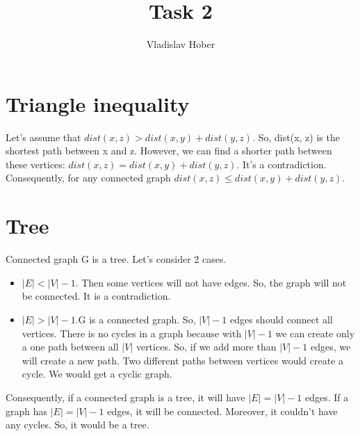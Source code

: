 \documentclass[12pt, letterpaper]{article}
\title{Task 2}
\author{Vladislav Hober}
\date{}
\begin{document}
\maketitle

\section{Triangle inequality}
Let's assume that 
\begin{math}dist(x, z) > dist(x, y) + dist(y, z)\end{math}.
So, dist(x, z) is the shortest path between x and z. However, we can find a shorter path between these vertices:
\begin{math}dist(x, z) = dist(x, y) + dist(y, z)\end{math}.
It's a contradiction. Consequently, for any connected graph
\begin{math}dist(x, z) \leq dist(x, y) + dist(y, z)\end{math}.

\section{Tree}
Connected graph G is a tree. Let's consider 2 cases.
\begin{itemize}
  \item \begin{math} |E| < |V| - 1 \end{math}.\newline
  Then some vertices will not have edges. So, the graph will not be connected. It is a contradiction.
  \item \begin{math} |E| > |V| - 1 \end{math}.\newline G is a connected graph. So, \begin{math}|V|-1\end{math} edges should connect all vertices. There is no cycles in a graph because with \begin{math}|V|-1\end{math}  we can create only a one path between all \begin{math}|V|\end{math} vertices. So, if we add more than \begin{math}|V|-1\end{math} edges, we will create a new path. Two different paths between vertices would create a cycle. We would get a cyclic graph.
\end{itemize}
 Consequently, if a connected graph is a tree, it will have \begin{math} |E| = |V| - 1 \end{math} edges.\newline
 If a graph has \begin{math} |E| = |V| - 1 \end{math} edges, it will be connected. Moreover, it couldn't have any cycles. So, it would be a tree.
\end{document}
